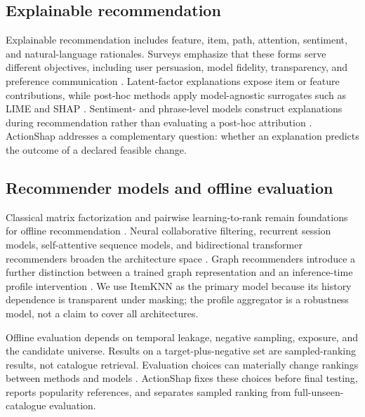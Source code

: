 \documentclass[pdflatex,sn-basic,Numbered]{sn-jnl}
\theoremstyle{thmstyleone}
\theoremstyle{thmstyletwo}
\theoremstyle{thmstylethree}
\begin{document}
\subsection{Explainable recommendation}
Explainable recommendation includes feature, item, path, attention, sentiment, and natural-language rationales. Surveys emphasize that these forms serve different objectives, including user persuasion, model fidelity, transparency, and preference communication \citep{zhang2020survey}. Latent-factor explanations expose item or feature contributions, while post-hoc methods apply model-agnostic surrogates such as LIME and SHAP \citep{peake2018,nobrega2019,ribeiro2016,lundberg2017}. Sentiment- and phrase-level models construct explanations during recommendation rather than evaluating a post-hoc attribution \citep{zhang2014,zheng2018}. ActionShap addresses a complementary question: whether an explanation predicts the outcome of a declared feasible change.

\subsection{Recommender models and offline evaluation}
Classical matrix factorization and pairwise learning-to-rank remain foundations for offline recommendation \citep{koren2009,joachims2002,rendle2009,burges2005}. Neural collaborative filtering, recurrent session models, self-attentive sequence models, and bidirectional transformer recommenders broaden the architecture space \citep{he2017ncf,hidasi2016gru4rec,kang2018sasrec,sun2019bert4rec}. Graph recommenders introduce a further distinction between a trained graph representation and an inference-time profile intervention \citep{wang2019ngcf,he2020lightgcn}. We use ItemKNN as the primary model because its history dependence is transparent under masking; the profile aggregator is a robustness model, not a claim to cover all architectures.

Offline evaluation depends on temporal leakage, negative sampling, exposure, and the candidate universe. Results on a target-plus-negative set are sampled-ranking results, not catalogue retrieval. Evaluation choices can materially change rankings between methods and models \citep{harper2016,bennett2007,zheng2017,saito2021,ji2020,chen2022,mcnamara2017}. ActionShap fixes these choices before final testing, reports popularity references, and separates sampled ranking from full-unseen-catalogue evaluation.
\end{document}
